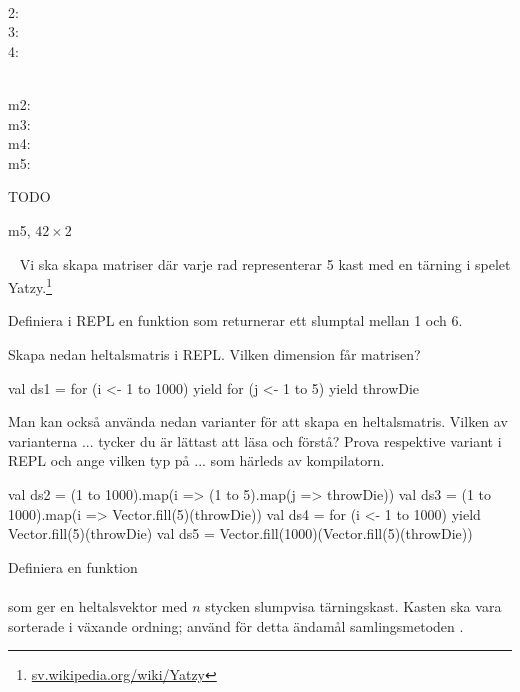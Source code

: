 \SubtaskSolved  \\
2: \\
3: \\
4: 

\SubtaskSolved  \\
m2: \\
m3: \\
m4: \\
m5: 

\SubtaskSolved  TODO

\SubtaskSolved  m5, $42 \times 2$



\QUESTEND









\QUESTBEGIN

\Task  \what~  Vi ska skapa matriser där varje rad representerar 5 kast med en tärning i spelet Yatzy.\footnote{\href{https://sv.wikipedia.org/wiki/Yatzy}{sv.wikipedia.org/wiki/Yatzy}}


\Subtask Definiera i REPL en funktion  som returnerar ett slumptal mellan 1 och 6.


\Subtask Skapa nedan heltalsmatris i REPL. Vilken dimension får matrisen?
\begin{REPL}
val ds1 = for (i <- 1 to 1000) yield {
            for (j <- 1 to 5) yield throwDie
          }
\end{REPL}

\Subtask\Pen Man kan också använda nedan varianter för att skapa en heltalsmatris. Vilken av varianterna  ...  tycker du är lättast att läsa och förstå? Prova respektive variant i REPL och ange vilken typ på  ...  som härleds av kompilatorn.
\begin{REPL}
val ds2 = (1 to 1000).map(i => (1 to 5).map(j => throwDie))
val ds3 = (1 to 1000).map(i => Vector.fill(5)(throwDie))
val ds4 = for (i <- 1 to 1000) yield Vector.fill(5)(throwDie)
val ds5 = Vector.fill(1000)(Vector.fill(5)(throwDie))
\end{REPL}


\Subtask Definiera en funktion \\ \\ som ger en heltalsvektor med $n$ stycken slumpvisa tärningskast. Kasten ska vara sorterade i växande ordning; använd för detta ändamål samlingsmetoden .



